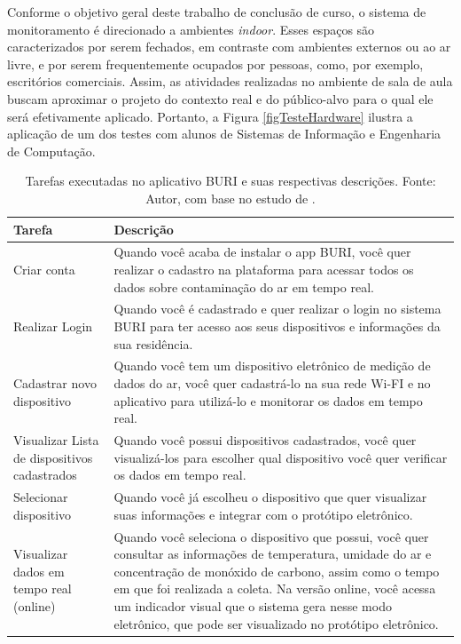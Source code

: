 Conforme o objetivo geral deste trabalho de conclusão de curso, o sistema de monitoramento é direcionado a ambientes \textit{indoor}. Esses espaços são 
caracterizados por serem fechados, em contraste com ambientes externos ou ao ar livre, e por serem frequentemente ocupados por pessoas, como, por exemplo, escritórios comerciais. Assim, as atividades realizadas no ambiente de sala de aula 
buscam aproximar o projeto do contexto real e do público-alvo para o qual ele será efetivamente aplicado. Portanto, a Figura \ref{figTesteHardware} ilustra a aplicação de um dos testes 
com alunos de Sistemas de Informação e Engenharia de Computação.

\begin{table}[htbp]
    \centering
    \caption{Tarefas executadas no aplicativo BURI e suas respectivas descrições. Fonte: Autor, com base no estudo de \cite{ufam-design}.}\label{tab:cenarios-de-uso}
    \begin{tabular}{p{4cm}|p{10cm}}
    \toprule
    \textbf{Tarefa} & \textbf{Descrição} \\ \midrule
    Criar conta & Quando você acaba de instalar o app BURI, você quer realizar o cadastro na plataforma para acessar todos os dados sobre contaminação do ar em tempo real. \\ \midrule
    Realizar Login & Quando você é cadastrado e quer realizar o login no sistema BURI para ter acesso aos seus dispositivos e informações da sua residência. \\ \midrule
    Cadastrar novo dispositivo & Quando você tem um dispositivo eletrônico de medição de dados do ar, você quer cadastrá-lo na sua rede Wi-FI e no aplicativo para utilizá-lo e monitorar os dados em tempo real. \\ \midrule
    Visualizar Lista de dispositivos cadastrados & Quando você possui dispositivos cadastrados, você quer visualizá-los para escolher qual dispositivo você quer verificar os dados em tempo real. \\ \midrule
    Selecionar dispositivo & Quando você já escolheu o dispositivo que quer visualizar suas informações e integrar com o protótipo eletrônico. \\ \midrule
    Visualizar dados em tempo real (online) & Quando você seleciona o dispositivo que possui, você quer consultar as informações de temperatura, umidade do ar e concentração de monóxido de carbono, assim como o tempo em que foi realizada a coleta. Na versão online, você acessa um indicador visual que o sistema gera nesse modo eletrônico, que pode ser visualizado no protótipo eletrônico. \\ \midrule

\end{tabular}
\end{table}
